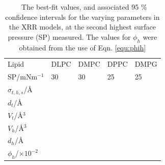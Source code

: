 \documentclass[amsmath,amssymb,superscriptaddress]{revtex4-1}
\begin{document}
%
%
\begin{table}
  \centering
	\caption{\ The best-fit values, and associated 95 \% confidence intervals for the varying parameters in the XRR models, at the second highest surface pressure (SP) measured. The values for $\phi_h$ were obtained from the use of Eqn. \ref{equ:phih}}
	\label{tab:liptab2}
	\begin{tabular}{l|l|l|l|l}
		Lipid & DLPC & DMPC & DPPC & DMPG \\
    SP/mNm$^{-1}$ & 30 & 30 & 25 & 25 \\
		\hline
		$\sigma_{t,h,s}$/\AA &  &  &  &  \\
    $d_t$/\AA &  &  &  &  \\
    \hline
    $V_t$/\AA$^3$ &  &  &  &  \\
		$V_h$/\AA$^3$ &  &  &  &  \\
		$d_h$/\AA &  &  &  &  \\
    \hline
    $\phi_h$/$\times10^{-2}$ &  &  &  &  \\
	\end{tabular}
\end{table}
%
%
\end{document}
